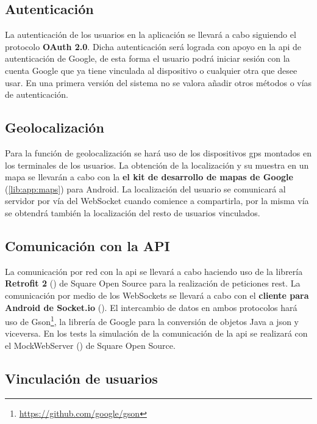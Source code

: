\subsection{Autenticación}

La autenticación de los usuarios en la aplicación se llevará a cabo siguiendo el protocolo \textbf{OAuth 2.0}\cite{rfc6749}. Dicha autenticación será lograda con apoyo en la \acrshort{api} de autenticación de Google, de esta forma el usuario podrá iniciar sesión con la cuenta Google que ya tiene vinculada al dispositivo o cualquier otra que desee usar. En una primera versión del sistema no se valora añadir otros métodos o vías de autenticación.

\subsection{Geolocalización}

Para la función de geolocalización se hará uso de los dispositivos \acrshort{gps} montados en los terminales de los usuarios. La obtención de la localización y su muestra en un mapa se llevarán a cabo con la \textbf{el kit de desarrollo de mapas de Google} (\ref{lib:app:maps}) para Android. La localización del usuario se comunicará al servidor por vía del WebSocket cuando comience a compartirla, por la misma vía se obtendrá también la localización del resto de usuarios vinculados.

\subsection{Comunicación con la API}

La comunicación por red con la \acrshort{api} se llevará a cabo haciendo uso de la librería \textbf{Retrofit 2} () de Square Open Source para la realización de peticiones \acrshort{rest}. La comunicación por medio de los WebSockets se llevará a cabo con el \textbf{cliente para Android de Socket.io} (). El intercambio de datos en ambos protocolos hará uso de Gson\footnote{\href{https://github.com/google/gson}{https://github.com/google/gson}}, la librería de Google para la conversión de objetos Java a \acrshort{json} y viceversa. En los tests la simulación de la comunicación de la \acrshort{api} se realizará con el MockWebServer () de Square Open Source.

\subsection{Vinculación de usuarios}

